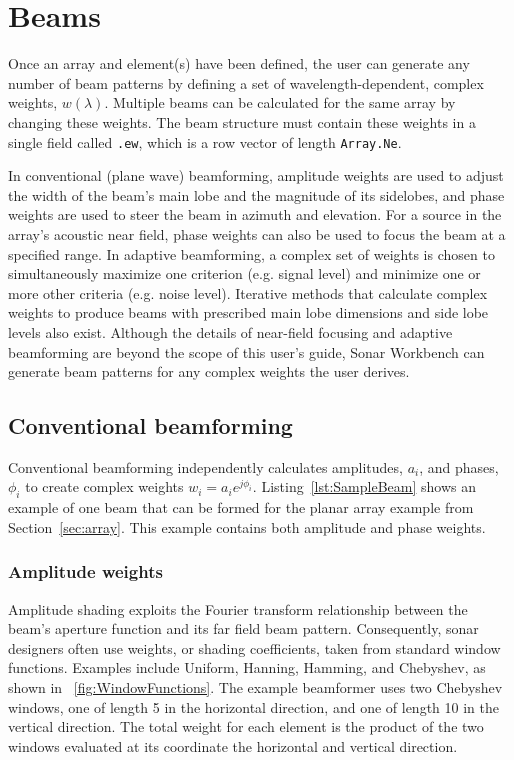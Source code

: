 \section{Beams}\label{sec:beam}

Once an array and element(s) have been defined, the user can generate any number of beam patterns by defining a set of wavelength-dependent, complex weights, $w(\lambda)$. Multiple beams can be calculated for the same array by changing these weights. The beam structure must contain these weights in a single field called \texttt{.ew}, which is a row vector of length \texttt{Array.Ne}.

In conventional (plane wave) beamforming, amplitude weights are used to adjust the width of the beam's main lobe and the magnitude of its sidelobes, and phase weights are used to steer the beam in azimuth and elevation. For a source in the array's acoustic near field, phase weights can also be used to focus the beam at a specified range. In adaptive beamforming, a complex set of weights is chosen to simultaneously maximize one criterion (e.g. signal level) and minimize one or more other criteria (e.g. noise level). Iterative methods that calculate complex weights to produce beams with prescribed main lobe dimensions and side lobe levels also exist.  Although the details of near-field focusing and adaptive beamforming are beyond the scope of this user's guide, Sonar Workbench can generate beam patterns for any complex weights the user derives.

\subsection{Conventional beamforming}

Conventional beamforming independently calculates amplitudes, $a_i$, and phases, $\phi_i$ to create complex weights $w_i=a_ie^{j\phi_i}$. Listing~\ref{lst:SampleBeam} shows an example of one beam that can be formed for the planar array example from Section~\ref{sec:array}. This example contains both amplitude and phase weights.



\subsubsection{Amplitude weights}

Amplitude shading exploits the Fourier transform relationship between the beam's aperture function and its far field beam pattern. Consequently, sonar designers often use weights, or shading coefficients, taken from standard window functions. Examples include Uniform, Hanning, Hamming, and Chebyshev, as shown in \figname~\ref{fig:WindowFunctions}. The example beamformer uses two Chebyshev windows, one of length 5 in the horizontal direction, and one of length 10 in the vertical direction. The total weight for each element is the product of the two windows evaluated at its coordinate the horizontal and vertical direction.

